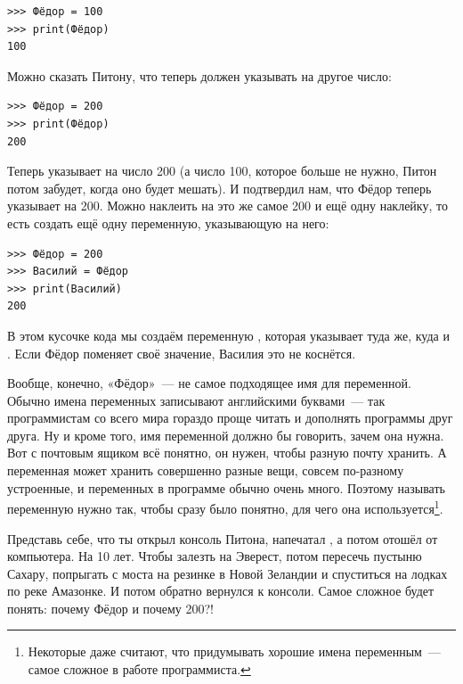 \begin{listing}
\begin{verbatim}
>>> Фёдор = 100
>>> print(Фёдор)
100
\end{verbatim}
\end{listing}

Можно сказать Питону, что  теперь должен указывать на другое число:

\begin{listing}
\begin{verbatim}
>>> Фёдор = 200
>>> print(Фёдор)
200
\end{verbatim}
\end{listing}

Теперь  указывает на число 200 (а число 100, которое больше не нужно, Питон потом забудет, когда оно будет мешать). И  подтвердил нам, что Фёдор теперь указывает на 200.
Можно наклеить на это же самое 200 и ещё одну наклейку, то есть создать ещё одну переменную, указывающую на него:

\begin{listing}
\begin{verbatim}
>>> Фёдор = 200
>>> Василий = Фёдор
>>> print(Василий)
200
\end{verbatim}
\end{listing}

В этом кусочке кода мы создаём переменную , которая указывает туда же, куда и . Если Фёдор поменяет своё значение, Василия это не коснётся.

Вообще, конечно, «Фёдор» — не самое подходящее имя для переменной. Обычно имена переменных записывают английскими буквами — так программистам со всего мира гораздо проще читать и дополнять программы друг друга. Ну и кроме того, имя переменной должно бы говорить, зачем она нужна. Вот с почтовым ящиком всё понятно, он нужен, чтобы разную почту хранить. А переменная может хранить совершенно разные вещи, совсем по-разному устроенные, и переменных в программе обычно очень много. Поэтому называть переменную нужно так, чтобы сразу было понятно, для чего она используется\footnote{Некоторые даже считают, что придумывать хорошие имена переменным — самое сложное в работе программиста.}.

Представь себе, что ты открыл консоль Питона, напечатал , а потом отошёл от компьютера. На 10 лет. Чтобы залезть на Эверест, потом пересечь пустыню Сахару, попрыгать с моста на резинке в Новой Зеландии и спуститься на лодках по реке Амазонке. И потом обратно вернулся к консоли. Самое сложное будет понять: почему Фёдор и почему 200?!

